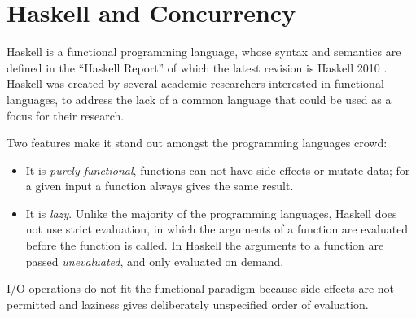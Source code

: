 
\chapter{Haskell and Concurrency}
\label{chap:haskell}

Haskell is a functional programming language, whose syntax and semantics are defined in the ``Haskell Report'' of which the latest revision is Haskell 2010 \cite{Marlow_haskell2010}. Haskell was created by several academic researchers interested in functional languages, to address the lack of a common language that could be used as a focus for their research.

Two features make it stand out amongst the programming languages crowd:
\begin{itemize}
\item It is \emph{purely functional}, \ie functions can not have side effects or mutate data; for a given input a function always gives the same result.
\item It is \emph{lazy}. Unlike the majority of the programming languages, Haskell does not use strict evaluation, in which the arguments of a function are evaluated before the function is called. In Haskell the arguments to a function are passed \emph{unevaluated}, and only evaluated on demand.
\end{itemize}

I/O operations do not fit the functional paradigm because side effects are not permitted and laziness gives deliberately unspecified order of evaluation.

